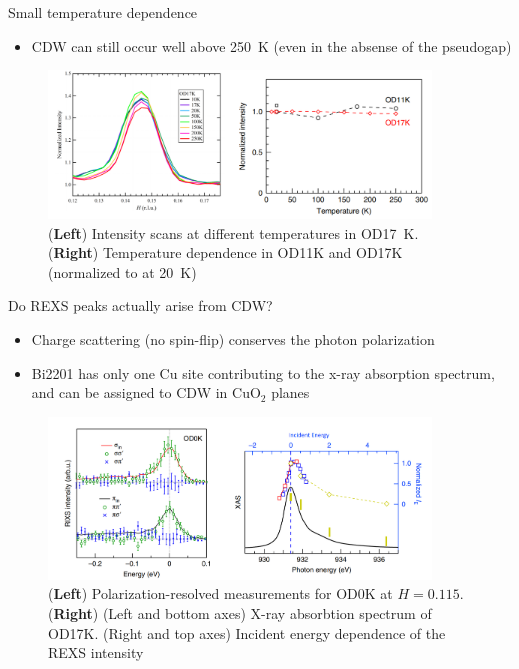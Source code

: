\documentclass{beamer}
\begin{document}
\begin{frame}{Small temperature dependence}
\begin{itemize}
\item CDW can still occur well above 250~K (even in the absense of the pseudogap)
\end{itemize}
\begin{figure}
\includegraphics[width=4in]{figs/2018_s10_3d.png}
\caption*{(\textbf{Left}) Intensity scans at different temperatures in OD17~K. (\textbf{Right}) Temperature dependence in OD11K and OD17K (normalized to at 20~K)}
\end{figure}
\end{frame}

\begin{frame}{Do REXS peaks actually arise from CDW?}
\begin{itemize}
\item Charge scattering (no spin-flip) conserves the photon polarization
\item Bi2201 has only one Cu site contributing to the x-ray absorption spectrum, and can be assigned to CDW in CuO$_2$ planes
\end{itemize}
\begin{figure}
\includegraphics[width=4in]{figs/2018_2c_3a.png}
\caption*{(\textbf{Left}) Polarization-resolved measurements for OD0K at $H = 0.115$. (\textbf{Right}) (Left and bottom axes) X-ray absorbtion spectrum of OD17K. (Right and top axes) Incident energy dependence of the REXS intensity}
\end{figure}
\end{frame}
\end{document}
